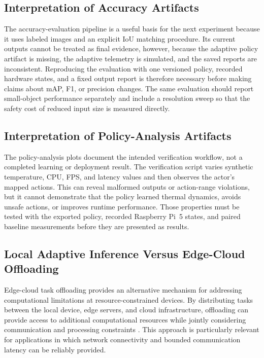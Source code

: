 \documentclass{ieeeaccess}
\begin{document}
\subsection{Interpretation of Accuracy Artifacts}

The accuracy-evaluation pipeline is a useful basis for the next experiment
because it uses labeled images and an explicit IoU matching procedure. Its
current outputs cannot be treated as final evidence, however, because the
adaptive policy artifact is missing, the adaptive telemetry is simulated, and
the saved reports are inconsistent. Reproducing the evaluation with one
versioned policy, recorded hardware states, and a fixed output report is
therefore necessary before making claims about mAP, F1, or precision changes.
The same evaluation should report small-object performance separately and
include a resolution sweep so that the safety cost of reduced input size is
measured directly.

\subsection{Interpretation of Policy-Analysis Artifacts}

The policy-analysis plots document the intended verification workflow, not a
completed learning or deployment result. The verification script varies
synthetic temperature, CPU, FPS, and latency values and then observes the
actor's mapped actions. This can reveal malformed outputs or action-range
violations, but it cannot demonstrate that the policy learned thermal
dynamics, avoids unsafe actions, or improves runtime performance. Those
properties must be tested with the exported policy, recorded Raspberry Pi~5
states, and paired baseline measurements before they are presented as results.

\subsection{Local Adaptive Inference Versus Edge-Cloud Offloading}

Edge-cloud task offloading provides an alternative mechanism for addressing
computational limitations at resource-constrained devices. By distributing
tasks between the local device, edge servers, and cloud infrastructure,
offloading can provide access to additional computational resources while
jointly considering communication and processing constraints
\cite{b25}. This approach is particularly relevant for applications in which
network connectivity and bounded communication latency can be reliably
provided.
\end{document}
